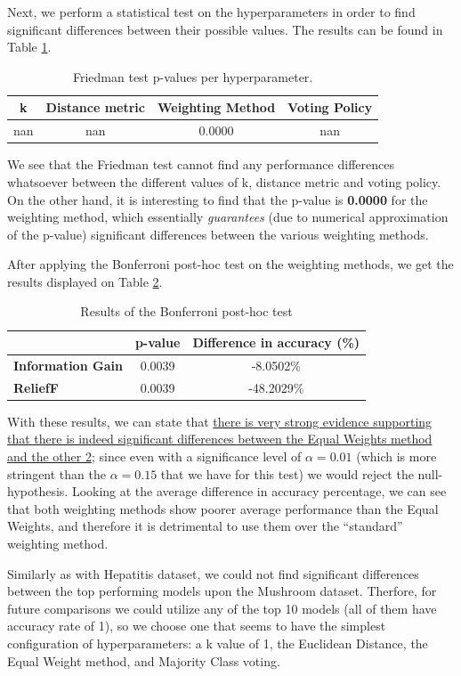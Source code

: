Next, we perform a statistical test on the hyperparameters in order to find significant differences between their possible values. The results can be found in Table \ref{tab:knn:mush:hyperparam}.
\begin{table}[h]
    \centering
    \small
    \begin{tabular}{|c|c|c|c|}
        \hline
        \textbf{k} & \textbf{Distance metric} & \textbf{Weighting Method} & \textbf{Voting Policy} \\ \hline
        nan & nan & 0.0000 & nan \\ \hline
    \end{tabular}
    \caption{Friedman test p-values per hyperparameter.}
    \label{tab:knn:mush:hyperparam}
\end{table}

We see that the Friedman test cannot find any performance differences whatsoever between the different values of k, distance metric and voting policy. On the other hand, it is interesting to find that the p-value is \textbf{0.0000} for the weighting method, which essentially \textit{guarantees} (due to numerical approximation of the p-value) significant differences between the various weighting methods.

After applying the Bonferroni post-hoc test on the weighting methods, we get the results displayed on Table \ref{tab:knn:mush:posthoc}.
\begin{table}[h!]
    \centering
    \small
    \begin{tabular}{|l|c|c|}
    \hline
                             & \textbf{p-value} & \textbf{Difference in accuracy (\%)} \\ \hline
    \textbf{Information Gain} & 0.0039           & -8.0502\%          \\ \hline
    \textbf{ReliefF}           & 0.0039           & -48.2029\%          \\ \hline
    \end{tabular}
    \caption{Results of the Bonferroni post-hoc test}
    \label{tab:knn:mush:posthoc}
\end{table}

With these results, we can state that \uline{there is very strong evidence supporting that there is indeed significant differences between the Equal Weights method and the other 2}; since even with a significance level of $ \alpha = 0.01 $ (which is more stringent than the $ \alpha = 0.15 $ that we have for this test) we would reject the null-hypothesis. Looking at the average difference in accuracy percentage, we can see that both weighting methods show poorer average performance than the Equal Weights, and therefore it is detrimental to use them over the ``standard'' weighting method.

Similarly as with Hepatitis dataset, we could not find significant differences between the top performing models upon the Mushroom dataset. Therfore, for future comparisons we could utilize any of the top 10 models (all of them have accuracy rate of 1), so we choose one that seems to have the simplest configuration of hyperparameters: a k value of 1, the Euclidean Distance, the Equal Weight method, and Majority Class voting.
